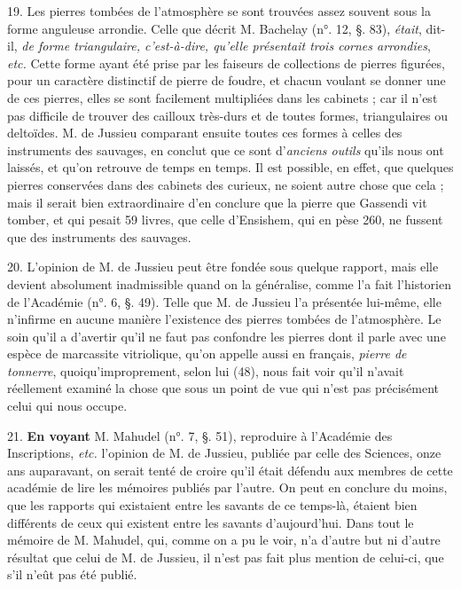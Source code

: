 \documentclass[a4paper, 11pt, oneside, polutonikogreek, french]{article}
\begin{document}
19. Les pierres tombées de l'atmosphère se sont trouvées assez souvent sous la forme anguleuse arrondie. Celle que décrit M. Bachelay (n°. 12, §. 83), \emph{était}, dit-il, \emph{de forme triangulaire, c'est-à-dire, qu'elle présentait trois cornes arrondies}, \emph{etc.} Cette forme ayant été prise par les faiseurs de collections de pierres figurées, pour un caractère distinctif de pierre de foudre, et chacun voulant se donner une de ces pierres, elles se sont facilement multipliées dans les cabinets ; car il n'est pas difficile de trouver des cailloux très-durs et de toutes formes, triangulaires ou deltoïdes. M. de Jussieu comparant ensuite toutes ces formes à celles des instruments des sauvages, en conclut que ce sont d'\emph{anciens outils} qu'ils nous ont laissés, et qu'on retrouve de temps en temps. Il est possible, en effet, que quelques pierres conservées dans des cabinets des curieux, ne soient autre chose que cela ; mais il serait bien extraordinaire d'en conclure que la pierre que Gassendi vit tomber, et qui pesait 59 livres, que celle d'Ensishem, qui en pèse 260, ne fussent que des instruments des sauvages.

20. L'opinion de M. de Jussieu peut être fondée sous quelque rapport, mais elle devient absolument inadmissible quand on la généralise, comme l'a fait l'historien de l'Académie (n°. 6, §. 49). Telle que M. de Jussieu l'a présentée lui-même, elle n'infirme en aucune manière l'existence des pierres tombées de l'atmosphère. Le soin qu'il a d'avertir qu'il ne faut pas confondre les pierres dont il parle avec une espèce de marcassite vitriolique, qu'on appelle aussi en français, \emph{pierre de tonnerre}, quoiqu'improprement, selon lui (48), nous fait voir qu'il n'avait réellement examiné la chose que sous un point de vue qui n'est pas précisément celui qui nous occupe.

21. \textbf{En voyant} M. Mahudel (n°. 7, §. 51), reproduire à l'Académie des Inscriptions, \emph{etc.} l'opinion de M. de Jussieu, publiée par celle des Sciences, onze ans auparavant, on serait tenté de croire qu'il était défendu aux membres de cette académie de lire les mémoires publiés par l'autre. On peut en conclure du moins, que les rapports qui existaient entre les savants de ce temps-là, étaient bien différents de ceux qui existent entre les savants d'aujourd'hui. Dans tout le mémoire de M. Mahudel, qui, comme on a pu le voir, n'a d'autre but ni d'autre résultat que celui de M. de Jussieu, il n'est pas fait plus mention de celui-ci, que s'il n'eût pas été publié.
\end{document}

